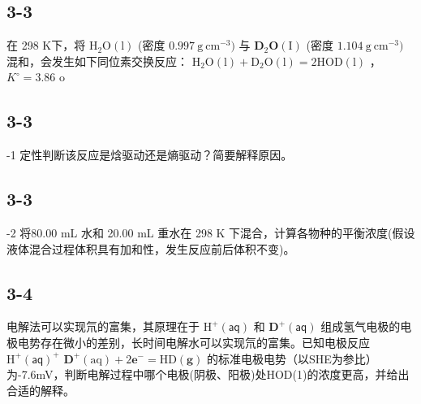 \subsection*{3-3}
在 298 K下，将 $\mathrm { H } _ { 2 } \mathrm { O ( l ) }$ (密度 $0 . 9 9 7 \ \mathrm { g } \ \mathrm { c m } ^ { - 3 } )$ 与 $\mathbf { D } _ { 2 } \mathbf { O } ( \mathrm { I } )$ (密度 $1 . 1 0 4 \ \mathrm { g } \ \mathrm { c m } ^ { - 3 } )$ 混和，会发生如下同位素交换反应： $\mathrm { H } _ { 2 } \mathrm { O } ( \mathrm { l } ) + \mathrm { D } _ { 2 } \mathrm { O } ( \mathrm { l } ) = 2 \mathrm { H } \mathrm { O D } ( \mathrm { l } )$ ， $K ^ { \circ } = 3 . 8 6$ o

\subsection*{3-3}
-1 定性判断该反应是焓驱动还是熵驱动？简要解释原因。

\subsection*{3-3}
-2 将80.00 mL 水和 20.00 mL 重水在 298 K 下混合，计算各物种的平衡浓度(假设液体混合过程体积具有加和性，发生反应前后体积不变)。

\subsection*{3-4}
电解法可以实现氘的富集，其原理在于 $\mathrm { H } ^ { + } ( { \mathsf { a q } } )$ 和 $\mathbf { D } ^ { + } ( { \mathsf { a q } } )$ 组成氢气电极的电极电势存在微小的差别，长时间电解水可以实现氘的富集。已知电极反应 $\mathrm { H } ^ { + } ( { \mathsf { a q } } ) ^ { + }$ $\mathbf { D } ^ { + } ( \mathrm { a q } ) + 2 \mathbf { e } ^ { - } = \mathrm { H D } ( \mathbf { g } )$ 的标准电极电势（以SHE为参比）为-7.6mV，判断电解过程中哪个电极(阴极、阳极)处HOD(1)的浓度更高，并给出合适的解释。
